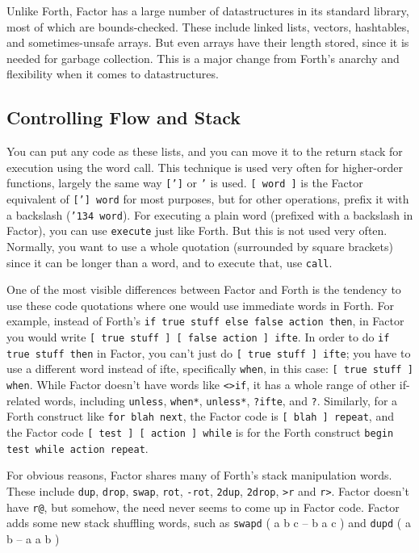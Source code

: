 \documentclass{article}
\begin{document}
Unlike Forth, Factor has a large number of datastructures in its standard library, most of which are bounds-checked. These include linked lists, vectors, hashtables, and sometimes-unsafe arrays. But even arrays have their length stored, since it is needed for garbage collection. This is a major change from Forth's anarchy and flexibility when it comes to datastructures.

\subsection{Controlling Flow and Stack}

You can put any code as these lists, and you can move it to the return stack for execution using the word call. This technique is used very often for higher-order functions, largely the same way \texttt{[']} or \texttt{'} is used. \texttt{[ word ]} is the Factor equivalent of \texttt{['] word} for most purposes, but for other operations, prefix it with a backslash (\texttt{\char'134 word}). For executing  a plain word (prefixed with a backslash in Factor), you can use \texttt{execute} just like Forth. But this is not used very often. Normally, you want to use a whole quotation (surrounded by square brackets) since it can be longer than a word, and to execute that, use \texttt{call}.

One of the most visible differences between Factor and Forth is the tendency to use these code quotations where one would use immediate words in Forth. For example, instead of Forth's \verb|if true stuff else false action then|, in Factor you would write \verb|[ true stuff ] [ false action ] ifte|. In order to do \verb|if true stuff then| in Factor, you can't just do \verb|[ true stuff ] ifte|; you have to use a different word instead of ifte, specifically \texttt{when}, in this case: \verb|[ true stuff ] when|. While Factor doesn't have words like \texttt{<>if}, it has a whole range of other if-related words, including \texttt{unless}, \texttt{when*}, \texttt{unless*}, \texttt{?ifte}, and \texttt{?}. Similarly, for a Forth construct like \verb|for blah next|, the Factor code is \verb|[ blah ] repeat|, and the Factor code \verb|[ test ] [ action ] while| is for the Forth construct \verb|begin test while action repeat|.

For obvious reasons, Factor shares many of Forth's stack manipulation words. These include \texttt{dup}, \texttt{drop}, \texttt{swap}, \texttt{rot}, \texttt{-rot}, \texttt{2dup}, \texttt{2drop}, \texttt{>r} and \texttt{r>}. Factor doesn't have \texttt{r@}, but somehow, the need never seems to come up in Factor code. Factor adds some new stack shuffling words, such as \texttt{swapd} ( a b c -- b a c ) and \texttt{dupd} ( a b -- a a b )
\end{document}
